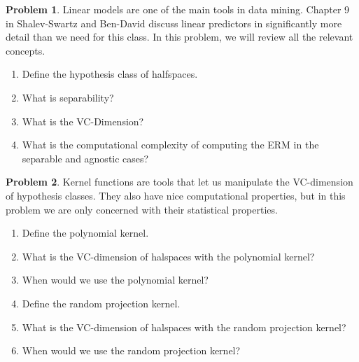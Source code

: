 \documentclass[10pt]{article}
\theoremstyle{definition}
\newtheorem{problem}{Problem}
\begin{document}
\newpage
\begin{problem}
    Linear models are one of the main tools in data mining.
    Chapter 9 in Shalev-Swartz and Ben-David discuss linear predictors in significantly more detail than we need for this class.
    In this problem, we will review all the relevant concepts.
    \begin{enumerate}
        \item Define the hypothesis class of halfspaces.
            \vspace{5in}
        \item What is separability?
            \vspace{0.8in}
        \item What is the VC-Dimension?
            \vspace{0.8in}
        \item What is the computational complexity of computing the ERM in the separable and agnostic cases?
            \vspace{0.8in}
    \end{enumerate}
\end{problem}


\begin{problem}
    Kernel functions are tools that let us manipulate the VC-dimension of hypothesis classes.
    They also have nice computational properties,
    but in this problem we are only concerned with their statistical properties.
    \begin{enumerate}
        \item Define the polynomial kernel. 
            \vspace{4.5in}
        \item What is the VC-dimension of halspaces with the polynomial kernel?
            \vspace{2in}
        \item When would we use the polynomial kernel?
            \newpage
        \item Define the random projection kernel.
            \vspace{4.5in}
        \item What is the VC-dimension of halspaces with the random projection kernel?
            \vspace{2in}
        \item When would we use the random projection kernel?
    \end{enumerate}
\end{problem}

%
%
%
\end{document}
